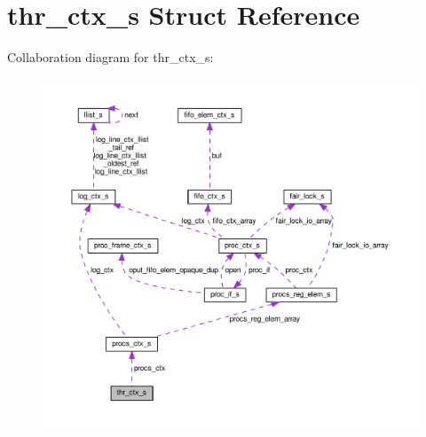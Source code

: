 \hypertarget{structthr__ctx__s}{}\section{thr\+\_\+ctx\+\_\+s Struct Reference}
\label{structthr__ctx__s}


Collaboration diagram for thr\+\_\+ctx\+\_\+s\+:\nopagebreak
\begin{figure}[H]
\begin{center}
\leavevmode
\includegraphics[width=350pt]{structthr__ctx__s__coll__graph}
\end{center}
\end{figure}
